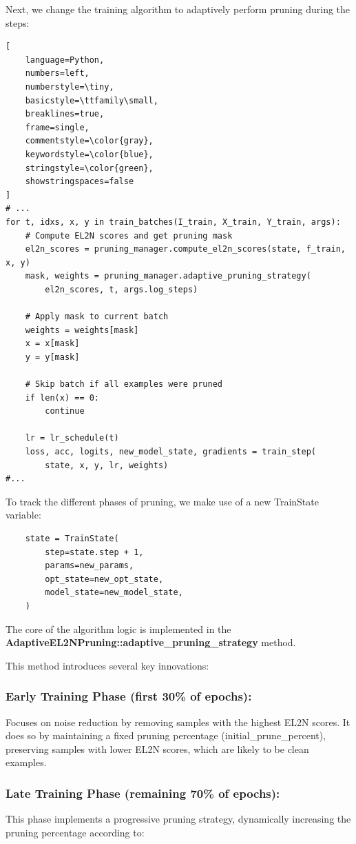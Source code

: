 \documentclass{article}
\begin{document}
Next, we change the training algorithm to adaptively perform pruning during the steps:
\begin{lstlisting}[
    language=Python,
    numbers=left,
    numberstyle=\tiny,
    basicstyle=\ttfamily\small,
    breaklines=true,
    frame=single,
    commentstyle=\color{gray},
    keywordstyle=\color{blue},
    stringstyle=\color{green},
    showstringspaces=false
]
# ...
for t, idxs, x, y in train_batches(I_train, X_train, Y_train, args):
    # Compute EL2N scores and get pruning mask
    el2n_scores = pruning_manager.compute_el2n_scores(state, f_train, x, y)
    mask, weights = pruning_manager.adaptive_pruning_strategy(
        el2n_scores, t, args.log_steps)

    # Apply mask to current batch
    weights = weights[mask]
    x = x[mask]
    y = y[mask]

    # Skip batch if all examples were pruned
    if len(x) == 0:
        continue

    lr = lr_schedule(t)
    loss, acc, logits, new_model_state, gradients = train_step(
        state, x, y, lr, weights)
#...
\end{lstlisting}

To track the different phases of pruning, we make use of a new TrainState variable:

\begin{verbatim}
    state = TrainState(
        step=state.step + 1,
        params=new_params,
        opt_state=new_opt_state,
        model_state=new_model_state,
    )
\end{verbatim}

The core of the algorithm logic is implemented in the \newline \textbf{AdaptiveEL2NPruning::adaptive\_pruning\_strategy} method. 

This method introduces several key innovations:

\subsubsection{Early Training Phase (first 30\% of epochs):}
Focuses on noise reduction by removing samples with the highest EL2N scores. It does so by maintaining a fixed pruning percentage (initial\_prune\_percent), preserving samples with lower EL2N scores, which are likely to be clean examples.

\subsubsection{Late Training Phase (remaining 70\% of epochs):}
This phase implements a progressive pruning strategy, dynamically increasing the pruning percentage according to: 
\end{document}
